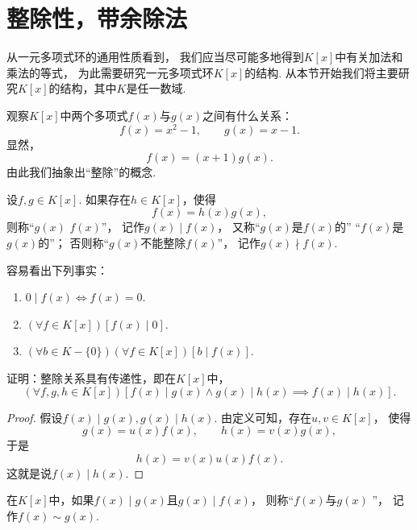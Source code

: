 \section{整除性，带余除法}
从一元多项式环的通用性质看到，
我们应当尽可能多地得到\(K[x]\)中有关加法和乘法的等式，
为此需要研究一元多项式环\(K[x]\)的结构.
从本节开始我们将主要研究\(K[x]\)的结构，其中\(K\)是任一数域.

观察\(K[x]\)中两个多项式\(f(x)\)与\(g(x)\)之间有什么关系：\[
	f(x)=x^2-1, \qquad
	g(x)=x-1.
\]
显然，\[
	f(x)=(x+1) g(x).
\]
由此我们抽象出“整除”的概念.

\begin{definition}
设\(f,g \in K[x]\).
如果存在\(h \in K[x]\)，使得\[
	f(x) = h(x) g(x),
\]
则称“\(g(x)\)  \(f(x)\)”，
记作\(g(x) \mid f(x)\)，
又称“\(g(x)\)是\(f(x)\)的”
“\(f(x)\)是\(g(x)\)的”；
否则称“\(g(x)\)不能整除\(f(x)\)”，
记作\(g(x) \nmid f(x)\).
\end{definition}

容易看出下列事实：
\begin{enumerate}
	\item \(0 \mid f(x) \iff f(x) = 0\).
	\item \((\forall f \in K[x])[f(x) \mid 0]\).
	\item \((\forall b \in K - \{0\})(\forall f \in K[x])[b \mid f(x)]\).
\end{enumerate}

\begin{example}
证明：整除关系具有传递性，即在\(K[x]\)中，\[
	(\forall f,g,h \in K[x])
	[
		f(x) \mid g(x) \land g(x) \mid h(x)
		\implies
		f(x) \mid h(x)
	].
\]
\begin{proof}
假设\(f(x) \mid g(x), g(x) \mid h(x)\).
由定义可知，存在\(u,v \in K[x]\)，
使得\[
	g(x) = u(x) f(x), \qquad
	h(x) = v(x) g(x),
\]
于是\[
	h(x) = v(x) u(x) f(x).
\]
这就是说\(f(x) \mid h(x)\).
\end{proof}
\end{example}

\begin{definition}
在\(K[x]\)中，如果\(f(x) \mid g(x)\)且\(g(x) \mid f(x)\)，
则称“\(f(x)\)与\(g(x)\) ”，
记作\(f(x) \sim g(x)\).
\end{definition}

